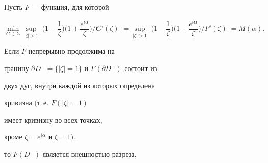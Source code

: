\begin{thm} Пусть $F$ --- функция, для которой


$$


\min_{G \in \Sigma}\sup_{|\zeta|>1}\bigg|\bigg(1-\frac{1}{\zeta}\bigg)


\bigg(1+\frac{e^{i\alpha}}{\zeta}\bigg)/


G'(\zeta)\bigg| =


\sup_{|\zeta|>1}\bigg|\bigg(1-\frac{1}{\zeta}\bigg)


\bigg(1+\frac{e^{i\alpha}}{\zeta}\bigg)/


F'(\zeta)\bigg| = M(\alpha).


$$


Если $F$ непрерывно продолжима на


границу $\partial{D^-}=\{|\zeta|=1\}$ и $F(\partial{D^-})$ состоит из


двух дуг, внутри каждой из которых определена


кривизна $($т.\,е. $F(|\zeta|=1)$


имеет кривизну во всех точках,


кроме $\zeta=e^{i\alpha}$ и  $\zeta=1)$,


то $F(D^-)$ является внешностью разреза.


\end{thm}





